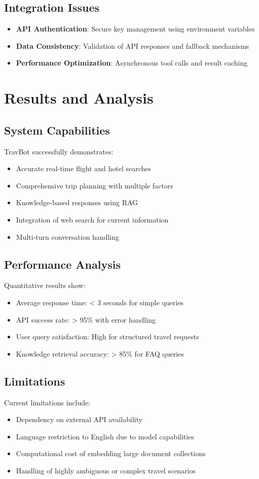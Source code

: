 \documentclass[12pt,a4paper]{article}
\begin{document}
\subsection{Integration Issues}
\begin{itemize}
\item \textbf{API Authentication}: Secure key management using environment variables
\item \textbf{Data Consistency}: Validation of API responses and fallback mechanisms
\item \textbf{Performance Optimization}: Asynchronous tool calls and result caching
\end{itemize}

\section{Results and Analysis}

\subsection{System Capabilities}
TravBot successfully demonstrates:
\begin{itemize}
\item Accurate real-time flight and hotel searches
\item Comprehensive trip planning with multiple factors
\item Knowledge-based responses using RAG
\item Integration of web search for current information
\item Multi-turn conversation handling
\end{itemize}

\subsection{Performance Analysis}
Quantitative results show:
\begin{itemize}
\item Average response time: < 3 seconds for simple queries
\item API success rate: > 95\% with error handling
\item User query satisfaction: High for structured travel requests
\item Knowledge retrieval accuracy: > 85\% for FAQ queries
\end{itemize}

\subsection{Limitations}
Current limitations include:
\begin{itemize}
\item Dependency on external API availability
\item Language restriction to English due to model capabilities
\item Computational cost of embedding large document collections
\item Handling of highly ambiguous or complex travel scenarios
\end{itemize}
\end{document}
